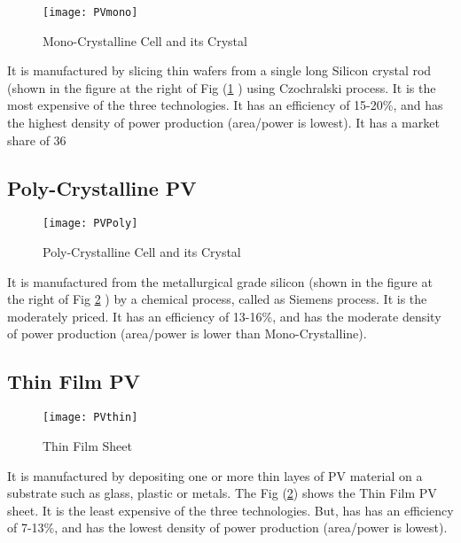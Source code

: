 \begin{figure}[H]
\centering
\texttt{[image: PVmono]}
\caption{Mono-Crystalline Cell and its Crystal}
\label{figc3h12} %
\end{figure}

It is manufactured by slicing thin wafers from a single long Silicon crystal rod (shown in the figure at the right of Fig (\ref{figc3h12} ) using Czochralski process. It is the most expensive of the three technologies. It has an efficiency of 15-20\%, and has the highest density of power production (area/power is lowest). It has a market share of 36%

\subsection{Poly-Crystalline PV}

\begin{figure}[H]
\centering
\texttt{[image: PVPoly]}
\caption{Poly-Crystalline Cell and its Crystal}
\label{figc3h13} %
\end{figure}

It is manufactured from the metallurgical grade silicon (shown in the figure at the right of Fig \ref{figc3h13} ) by a chemical process, called as Siemens process. It is the moderately priced. It has an efficiency of 13-16\%, and has the moderate density of power production (area/power is lower than Mono-Crystalline). 

\subsection{Thin Film PV}

\begin{figure}[H]
\centering
\texttt{[image: PVthin]}
\caption{Thin Film Sheet}
\label{figc3h14} %
\end{figure}

It is manufactured by depositing one or more thin layes of PV material on a substrate such as glass, plastic or metals. The  Fig (\ref{figc3h13}) shows the Thin Film PV sheet. It is the least expensive of the three technologies. But, has has an efficiency of 7-13\%, and has the lowest density of power production (area/power is lowest). 